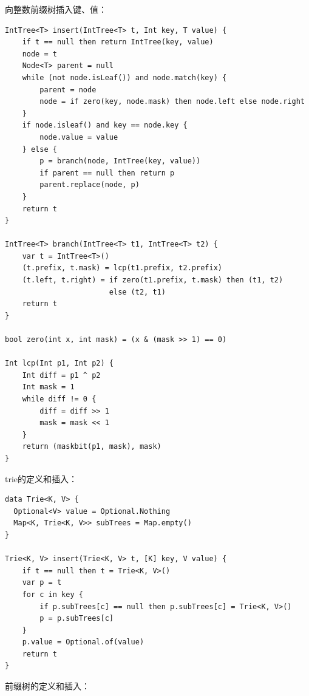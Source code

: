 \documentclass[b5paper]{ctexart}
\begin{document}
向整数前缀树插入键、值：

\begin{lstlisting}[language = Bourbaki]
IntTree<T> insert(IntTree<T> t, Int key, T value) {
    if t == null then return IntTree(key, value)
    node = t
    Node<T> parent = null
    while (not node.isLeaf()) and node.match(key) {
        parent = node
        node = if zero(key, node.mask) then node.left else node.right
    }
    if node.isleaf() and key == node.key {
        node.value = value
    } else {
        p = branch(node, IntTree(key, value))
        if parent == null then return p
        parent.replace(node, p)
    }
    return t
}

IntTree<T> branch(IntTree<T> t1, IntTree<T> t2) {
    var t = IntTree<T>()
    (t.prefix, t.mask) = lcp(t1.prefix, t2.prefix)
    (t.left, t.right) = if zero(t1.prefix, t.mask) then (t1, t2)
                        else (t2, t1)
    return t
}

bool zero(int x, int mask) = (x & (mask >> 1) == 0)

Int lcp(Int p1, Int p2) {
    Int diff = p1 ^ p2
    Int mask = 1
    while diff != 0 {
        diff = diff >> 1
        mask = mask << 1
    }
    return (maskbit(p1, mask), mask)
}
\end{lstlisting}


trie的定义和插入：

\begin{lstlisting}[language = Bourbaki]
data Trie<K, V> {
  Optional<V> value = Optional.Nothing
  Map<K, Trie<K, V>> subTrees = Map.empty()
}

Trie<K, V> insert(Trie<K, V> t, [K] key, V value) {
    if t == null then t = Trie<K, V>()
    var p = t
    for c in key {
        if p.subTrees[c] == null then p.subTrees[c] = Trie<K, V>()
        p = p.subTrees[c]
    }
    p.value = Optional.of(value)
    return t
}
\end{lstlisting}

前缀树的定义和插入：
\end{document}
